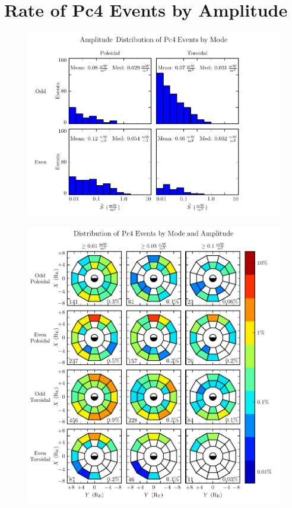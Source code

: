 \section{Rate of Pc4 Events by Amplitude}
  \label{sec_amp}


\begin{figure}[!htb]
    \centering
    \includegraphics[width=\textwidth]{figures/amp.pdf}
    \caption[TEST FIGURE]{
      \todo{$\cdots$}
    }
    \label{fig_amp}
\end{figure}


\begin{figure}[!htb]
    \centering
    \includegraphics[width=\textwidth]{figures/mode_amp.pdf}
    \caption[TEST FIGURE]{
      \todo{$\cdots$}
    }
    \label{fig_mode_amp}
\end{figure}


